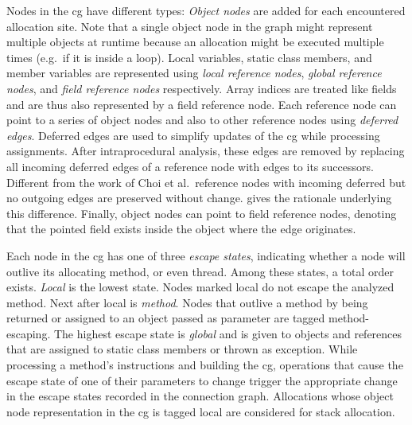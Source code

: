 			Nodes in the \gls{cg} have different types: \emph{Object nodes} are added for each encountered allocation site.
			Note that a single object node in the graph might represent multiple objects at runtime because an allocation
			might be executed multiple times (e.g.\ if it is inside a loop). Local variables, static class members, and member
			variables are represented using \emph{local reference nodes}, \emph{global reference nodes}, and \emph{field
			reference nodes} respectively. Array indices are treated like fields and are thus also represented by a field
			reference node. Each reference node can point to a series of object nodes and also to other reference nodes using
			\emph{deferred edges}. Deferred edges are used to simplify updates of the \gls{cg} while processing assignments.
			After intraprocedural analysis, these edges are removed by replacing all incoming deferred edges of a reference
			node with edges to its successors. Different from the work of Choi et al.\ reference nodes with incoming deferred
			but no outgoing edges are preserved without change.  gives the rationale
			underlying this difference. Finally, object nodes can point to field reference nodes, denoting that the pointed
			field exists inside the object where the edge originates.

			Each node in the \gls{cg} has one of three \emph{escape states}, indicating whether a node will outlive its
			allocating method, or even thread. Among these states, a total order exists. \emph{Local} is the lowest state.
			Nodes marked local do not escape the analyzed method. Next after local is \emph{method}. Nodes that outlive
			a method by being returned or assigned to an object passed as parameter are tagged method-escaping. The highest
			escape state is \emph{global} and is given to objects and references that are assigned to static class members or
			thrown as exception. While processing a method's instructions and building the \gls{cg}, operations that cause the
			escape state of one of their parameters to change trigger the appropriate change in the escape states recorded in
			the connection graph. Allocations whose object node representation in the \gls{cg} is tagged local are considered
			for stack allocation.


